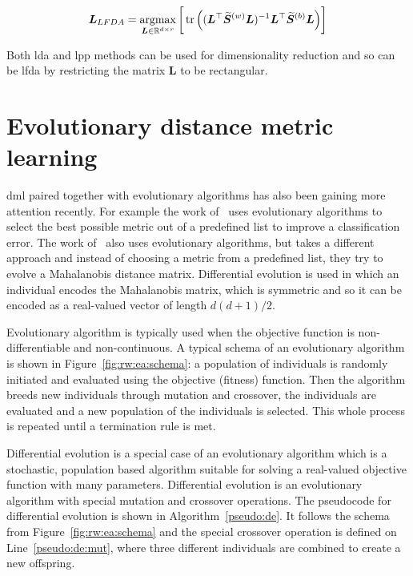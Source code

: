 \begin{equation}
\bm{L}_{LFDA} = \operatorname*{argmax}_{\bm{L} \in \mathbb{R}^{d \times r}} \bigg[\operatorname*{tr}\Big( ( \bm{L}^\top\widetilde{\bm{S}}^{(w)}\bm{L} )^{-1} \bm{L}^\top\widetilde{\bm{S}}^{(b)}\bm{L} \Big)\bigg] \label{eq:rw:lfda:objective}
\end{equation}

Both \ac{lda} and \ac{lpp} methods can be used for dimensionality reduction and so can be \ac{lfda} by restricting the matrix $\bm{L}$ to be rectangular.

\section{Evolutionary distance metric learning} \label{chap:rw:fukui}


\Ac{dml} paired together with evolutionary algorithms has also been gaining more attention recently. For example the work of~\citep{koloseni2012optimized} uses evolutionary algorithms to select the best possible metric out of a predefined list to improve a classification error. The work of~\citep{fukui2013evolutionary} also uses evolutionary algorithms, but takes a different approach and instead of choosing a metric from a predefined list, they try to evolve a Mahalanobis distance matrix. Differential evolution is used in which an individual encodes the Mahalanobis matrix, which is symmetric and so it can be encoded as a real-valued vector of length $d(d+1)/2$.

Evolutionary algorithm is typically used when the objective function is non-differentiable and non-continuous. A typical schema of an evolutionary algorithm is shown in Figure~\ref{fig:rw:ea:schema}: a population of individuals is randomly initiated and evaluated using the objective (fitness) function. Then the algorithm breeds new individuals through mutation and crossover, the individuals are evaluated and a new population of the individuals is selected. This whole process is repeated until a termination rule is met.


Differential evolution is a special case of an evolutionary algorithm which is a stochastic, population based algorithm suitable for solving a real-valued objective function with many parameters. Differential evolution is an evolutionary algorithm with special mutation and crossover operations. The pseudocode for differential evolution is shown in Algorithm~\ref{pseudo:de}. It follows the schema from Figure~\ref{fig:rw:ea:schema} and the special crossover operation is defined on Line~\ref{pseudo:de:mut}, where three different individuals are combined to create a new offspring.

